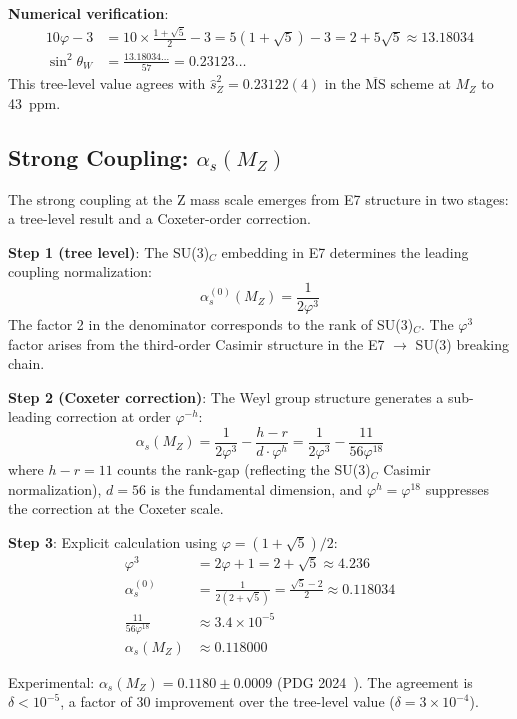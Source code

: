 \documentclass[11pt,a4paper]{article}
\begin{document}
\textbf{Numerical verification}:
\begin{align}
10\varphi - 3 &= 10 \times \frac{1+\sqrt{5}}{2} - 3 = 5(1+\sqrt{5}) - 3 = 2 + 5\sqrt{5} \approx 13.18034 \\
\sin^2\theta_W &= \frac{13.18034\ldots}{57} = 0.23123\ldots
\end{align}
This tree-level value agrees with $\hat{s}_Z^2 = 0.23122(4)$ in the $\overline{\text{MS}}$ scheme at $M_Z$ to 43~ppm.

\subsection{Strong Coupling: $\alpha_s(M_Z)$}

The strong coupling at the Z mass scale emerges from E7 structure in two stages: a tree-level result and a Coxeter-order correction.

\textbf{Step 1 (tree level)}: The SU(3)$_C$ embedding in E7 determines the leading coupling normalization:
\begin{equation}
\alpha_s^{(0)}(M_Z) = \frac{1}{2\varphi^3}
\end{equation}
The factor 2 in the denominator corresponds to the rank of SU(3)$_C$. The $\varphi^3$ factor arises from the third-order Casimir structure in the E7 $\to$ SU(3) breaking chain.

\textbf{Step 2 (Coxeter correction)}: The Weyl group structure generates a sub-leading correction at order $\varphi^{-h}$:
\begin{equation}
\boxed{\alpha_s(M_Z) = \frac{1}{2\varphi^3} - \frac{h - r}{d \cdot \varphi^h} = \frac{1}{2\varphi^3} - \frac{11}{56\varphi^{18}}}
\end{equation}
where $h - r = 11$ counts the rank-gap (reflecting the SU(3)$_C$ Casimir normalization), $d = 56$ is the fundamental dimension, and $\varphi^h = \varphi^{18}$ suppresses the correction at the Coxeter scale.

\textbf{Step 3}: Explicit calculation using $\varphi = (1+\sqrt{5})/2$:
\begin{align}
\varphi^3 &= 2\varphi + 1 = 2 + \sqrt{5} \approx 4.236 \\
\alpha_s^{(0)} &= \frac{1}{2(2 + \sqrt{5})} = \frac{\sqrt{5} - 2}{2} \approx 0.118034 \\
\frac{11}{56\varphi^{18}} &\approx 3.4 \times 10^{-5} \\
\alpha_s(M_Z) &\approx 0.118000
\end{align}

Experimental: $\alpha_s(M_Z) = 0.1180 \pm 0.0009$ (PDG 2024~\cite{PDG2024}). The agreement is $\delta < 10^{-5}$, a factor of 30 improvement over the tree-level value ($\delta = 3 \times 10^{-4}$).
\end{document}
